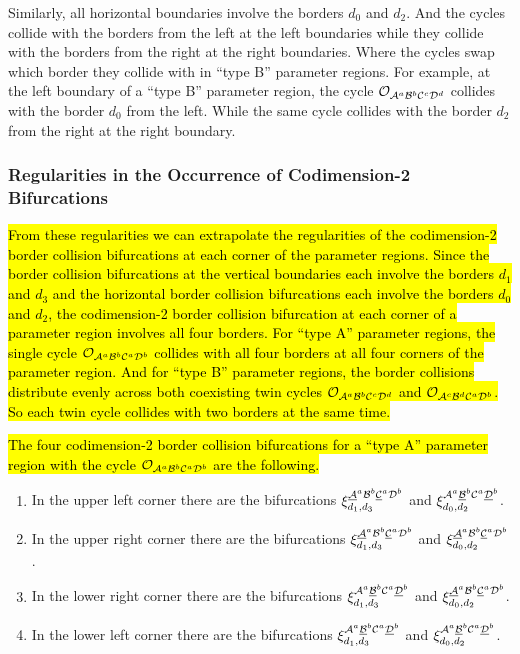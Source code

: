 Similarly, all horizontal boundaries involve the borders $d_0$ and $d_2$.
And the cycles collide with the borders from the left at the left boundaries while they collide with the borders from the right at the right boundaries.
Where the cycles swap which border they collide with in ``type B'' parameter regions.
For example, at the left boundary of a ``type B'' parameter region, the cycle $\mathcal{O}_{\mathcal{A}^a\mathcal{B}^b\mathcal{C}^c\mathcal{D}^d}$ collides with the border $d_0$ from the left.
While the same cycle collides with the border $d_2$ from the right at the right boundary.

\subsubsection{Regularities in the Occurrence of Codimension-2 Bifurcations}

\hl{
	From these regularities we can extrapolate the regularities of the codimension-2 border collision bifurcations at each corner of the parameter regions.
	Since the border collision bifurcations at the vertical boundaries each involve the borders $d_1$ and $d_3$ and the horizontal border collision bifurcations each involve the borders $d_0$ and $d_2$, the codimension-2 border collision bifurcation at each corner of a parameter region involves all four borders.
	For ``type A'' parameter regions, the single cycle $\mathcal{O}_{\mathcal{A}^a\mathcal{B}^b\mathcal{C}^a\mathcal{D}^b}$ collides with all four borders at all four corners of the parameter region.
	And for ``type B'' parameter regions, the border collisions distribute evenly across both coexisting twin cycles $\mathcal{O}_{\mathcal{A}^a\mathcal{B}^b\mathcal{C}^c\mathcal{D}^d}$ and $\mathcal{O}_{\mathcal{A}^c\mathcal{B}^d\mathcal{C}^a\mathcal{D}^b}$.
	So each twin cycle collides with two borders at the same time.
}

\hl{
	The four codimension-2 border collision bifurcations for a ``type A'' parameter region with the cycle $\mathcal{O}_{\mathcal{A}^a\mathcal{B}^b\mathcal{C}^a\mathcal{D}^b}$ are the following.
}

\begin{enumerate}
	\item In the upper left corner there are the bifurcations $\xi_{d_1, d_3}^{\underline{\mathcal{A}}^a\mathcal{B}^b\underline{\mathcal{C}}^a\mathcal{D}^b}$ and $\xi_{d_0, d_2}^{\mathcal{A}^a\underline{\mathcal{B}}^b\mathcal{C}^a\underline{\mathcal{D}}^b}$.
	\item In the upper right corner there are the bifurcations $\xi_{d_1, d_3}^{\underline{\mathcal{A}}^a\mathcal{B}^b\underline{\mathcal{C}}^a\mathcal{D}^b}$ and $\xi_{d_0, d_2}^{\underline{\mathcal{A}}^a\mathcal{B}^b\underline{\mathcal{C}}^a\mathcal{D}^b}$.
	\item In the lower right corner there are the bifurcations $\xi_{d_1, d_3}^{\mathcal{A}^a\underline{\mathcal{B}}^b\mathcal{C}^a\underline{\mathcal{D}}^b}$ and $\xi_{d_0, d_2}^{\underline{\mathcal{A}}^a\mathcal{B}^b\underline{\mathcal{C}}^a\mathcal{D}^b}$.
	\item In the lower left corner there are the bifurcations $\xi_{d_1, d_3}^{\mathcal{A}^a\underline{\mathcal{B}}^b\mathcal{C}^a\underline{\mathcal{D}}^b}$ and $\xi_{d_0, d_2}^{\mathcal{A}^a\underline{\mathcal{B}}^b\mathcal{C}^a\underline{\mathcal{D}}^b}$.
\end{enumerate}


